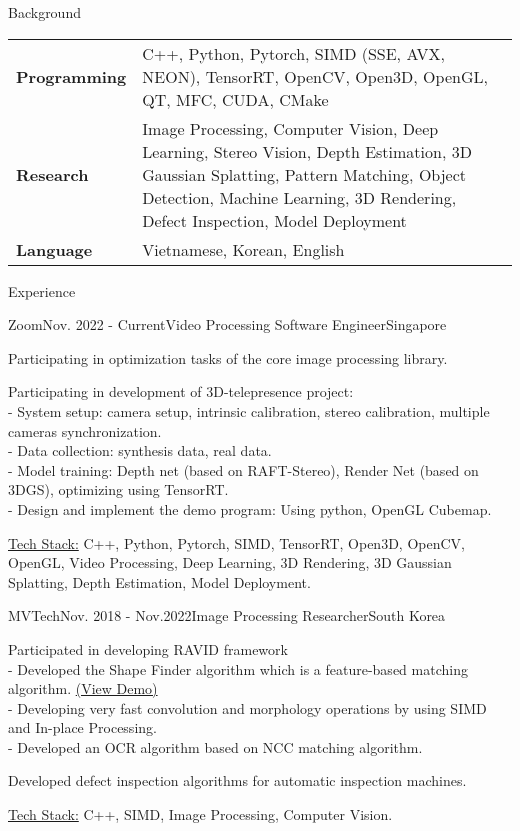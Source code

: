 \documentclass{resume}
\begin{document}
	\begin{rSection}{Background}
		\begin{tabular} {p{0.2\linewidth} p{0.8\linewidth}}
			\bf Programming & C++,  Python,  Pytorch, SIMD (SSE, AVX, NEON), TensorRT, OpenCV, Open3D, OpenGL, QT, MFC, CUDA, CMake \\
			\bf Research & Image Processing, Computer Vision,  Deep Learning,  Stereo Vision, Depth Estimation, 3D Gaussian Splatting, Pattern Matching, Object Detection, Machine Learning, 3D Rendering, Defect Inspection, Model Deployment \\
			\bf Language & Vietnamese, Korean, English
		\end{tabular}
		
	\end{rSection}

	\begin{rSection}{Experience}
		\begin{rSubsection}{Zoom}{Nov. 2022 - Current}{Video Processing Software  Engineer}{Singapore}
			\item Participating in optimization tasks of the core image processing library.
			\item Participating in development of 3D-telepresence project: \\
			- System setup: camera setup,  intrinsic calibration, stereo calibration, multiple cameras synchronization.\\
			- Data collection: synthesis data, real data.\\
			- Model training: Depth net (based on RAFT-Stereo),  Render Net (based on 3DGS),  optimizing using TensorRT.\\
			- Design and implement the demo program: Using python, OpenGL Cubemap.
			\item \underline{Tech Stack:} C++, Python, Pytorch, SIMD, TensorRT, Open3D, OpenCV, OpenGL, Video Processing, Deep Learning, 3D Rendering, 3D Gaussian Splatting,  Depth Estimation,  Model Deployment.

		\end{rSubsection}

		\begin{rSubsection}{MVTech}{Nov. 2018 - Nov.2022}{Image Processing Researcher}{South Korea}
			\item Participated in developing RAVID framework \\
			- Developed the Shape Finder algorithm which is a feature-based matching algorithm. \href{https://blog.naver.com/mvtech_ravid/222119961697}{(View Demo)}\\ 			
- Developing very fast convolution and morphology operations by using SIMD and In-place Processing. \\
			- Developed an OCR algorithm based on NCC matching algorithm.	
			\item Developed defect inspection algorithms for automatic inspection machines.
			\item \underline{Tech Stack:} C++, SIMD, Image Processing, Computer Vision.


\end{rSubsection}
\end{rSection}
\end{document}

